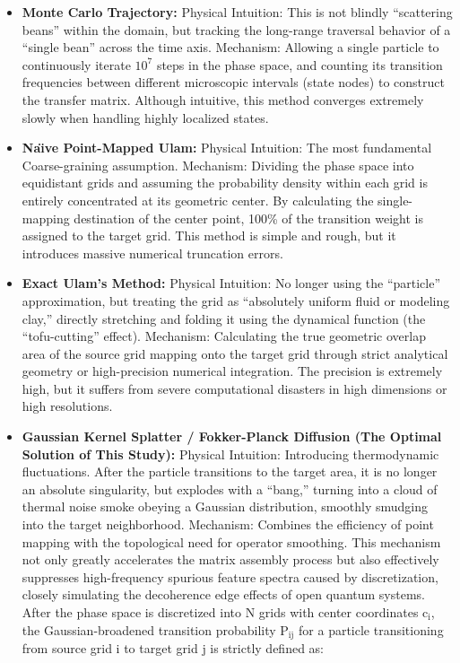 \documentclass[fleqn,10pt]{wlscirep}
\begin{document}
\begin{itemize}
\item
  \textbf{Monte Carlo Trajectory:} Physical Intuition: This is not
  blindly ``scattering beans'' within the domain, but tracking the
  long-range traversal behavior of a ``single bean'' across the time
  axis. Mechanism: Allowing a single particle to continuously iterate
  \(\text{10}^{\text{7}}\) steps in the phase space, and counting its
  transition frequencies between different microscopic intervals (state
  nodes) to construct the transfer matrix. Although intuitive, this
  method converges extremely slowly when handling highly localized
  states.
\item
  \textbf{Na\"\i{}ve Point-Mapped Ulam:} Physical Intuition: The most
  fundamental Coarse-graining assumption. Mechanism: Dividing the phase
  space into equidistant grids and assuming the probability density
  within each grid is entirely concentrated at its geometric center. By
  calculating the single-mapping destination of the center point, 100\%
  of the transition weight is assigned to the target grid. This method
  is simple and rough, but it introduces massive numerical truncation
  errors.
\item
  \textbf{Exact Ulam's Method:} Physical Intuition: No longer using the
  ``particle'' approximation, but treating the grid as ``absolutely
  uniform fluid or modeling clay,'' directly stretching and folding it
  using the dynamical function (the ``tofu-cutting'' effect). Mechanism:
  Calculating the true geometric overlap area of the source grid mapping
  onto the target grid through strict analytical geometry or
  high-precision numerical integration. The precision is extremely high,
  but it suffers from severe computational disasters in high dimensions
  or high resolutions.
\item
  \textbf{Gaussian Kernel Splatter / Fokker-Planck Diffusion (The
  Optimal Solution of This Study):} Physical Intuition: Introducing
  thermodynamic fluctuations. After the particle transitions to the
  target area, it is no longer an absolute singularity, but explodes
  with a ``bang,'' turning into a cloud of thermal noise smoke obeying a
  Gaussian distribution, smoothly smudging into the target neighborhood.
  Mechanism: Combines the efficiency of point mapping with the
  topological need for operator smoothing. This mechanism not only
  greatly accelerates the matrix assembly process but also effectively
  suppresses high-frequency spurious feature spectra caused by
  discretization, closely simulating the decoherence edge effects of
  open quantum systems. After the phase space is discretized into
  \(\text{N}\) grids with center coordinates \(\text{c}_{\text{i}}\),
  the Gaussian-broadened transition probability \(\text{P}_{\text{ij}}\)
  for a particle transitioning from source grid \(\text{i}\) to target
  grid \(\text{j}\) is strictly defined as:
\end{itemize}
\end{document}
